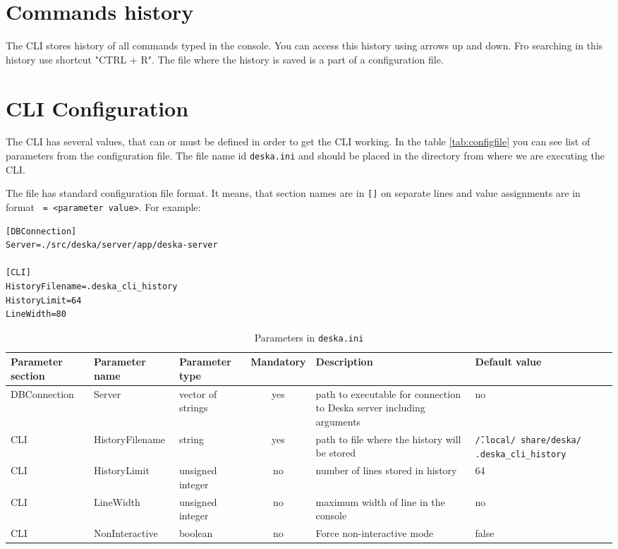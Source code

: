 \documentclass[deska]{subfiles}
\begin{document}
\section{Commands history}

The CLI stores history of all commands typed in the console. You can access this history using arrows up and down. Fro
searching in this history use shortcut "CTRL + R". The file where the history is saved is a part of a configuration
file.

\section{CLI Configuration}

The CLI has several values, that can or must be defined in order to get the CLI working. In the table \ref{tab:configfile}
you can see list of parameters from the configuration file. The file name id {\tt deska.ini} and should be placed in
the directory from where we are executing the CLI.

The file has standard configuration file format. It means, that section names are in {\tt []} on separate lines and
value assignments are in format {\tt <parameter name> = <parameter value>}. For example:
\begin{verbatim}
[DBConnection]
Server=./src/deska/server/app/deska-server

[CLI]
HistoryFilename=.deska_cli_history
HistoryLimit=64
LineWidth=80
\end{verbatim}

\label{tab:configfile}
\begin{longtable}{ p{2.2cm} | l | p{1.5cm} | c | p{3.5cm} | p{2.5cm} }
    \caption{Parameters in {\tt deska.ini}} \\
    Parameter section & Parameter name & Parameter type & Mandatory & Description & Default value \\
    \hline
    \endhead
    DBConnection & Server & vector of strings & yes & path to executable for connection to Deska server including arguments & no \\
    CLI & HistoryFilename & string & yes & path to file where the history will be stored & {\tt \~/.local/ share/deska/ .deska\_cli\_history} \\
    CLI & HistoryLimit & unsigned integer & no & number of lines stored in history & 64 \\
    CLI & LineWidth & unsigned integer & no & maximum width of line in the console & no \\
    CLI & NonInteractive & boolean & no & Force non-interactive mode & false \\
    \hline
\end{longtable}
\end{document}
